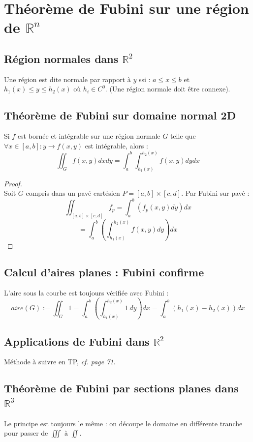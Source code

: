 \documentclass	[11pt, a4paper, openany]{book}
\begin{document}
\section{Théorème de Fubini sur une région de $\mathbb{R}^n$}
\subsection{Région normales dans $\mathbb{R}^2$}
Une région est dite normale par rapport à $y$ ssi : $a \leq x \leq b$ et $h_1(x) \leq y \leq h_2(x)$ où $h_i \in C^0$. (Une région normale doit être connexe).

\subsection{Théorème de Fubini sur domaine normal 2D}
Si $f$ est bornée et intégrable sur une région normale $G$ telle que $\forall x \in [a,b] : y \rightarrow f(x,y)$ est intégrable, alors :
$$\iint_G f(x,y) dx dy = \int_a^b\int_{h_1(x)}^{h_2(x)} f(x,y) dy dx$$

\begin{proof}\ \\
Soit $G$ compris dans un pavé cartésien $P = [a,b] \times [c,d]$. Par Fubini sur pavé : 
$$\iint_{[a,b]\times [c,d]} f_p = \int_a^b \left( f_p(x,y) dy\right) dx$$
$$= \int_a^b \left( \int_{h_1(x)}^{h_2(x)} f(x,y) dy \right)dx$$
\end{proof}

\subsection{Calcul d'aires planes : Fubini confirme}
L'aire sous la courbe est toujours vérifiée avec Fubini :
$$aire(G) := \iint_G 1 = \int_a^b \left( \int_{h_1(x)}^{h_2(x)} 1\ dy \right)dx = \int_a^b \left( h_1(x) - h_2(x)\right) dx$$

\subsection{Applications de Fubini dans $\mathbb{R}^2$}
Méthode à suivre en TP, \textit{cf. page 71}.

\subsection{Théorème de Fubini par sections planes dans $\mathbb{R}^3$}
Le principe est toujours le même : on découpe le domaine en différente tranche pour passer de $\iiint$ à $\iint$.
\end{document}
